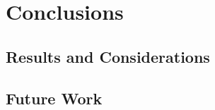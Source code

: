 
\chapter{Conclusions}\label{conclusioni} %





\section{Results and Considerations}
\section{Future Work}
 

